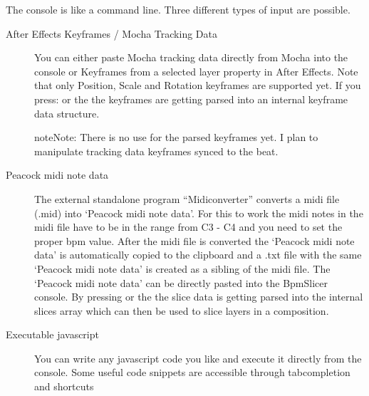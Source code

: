 \documentclass[a4paper,11pt,openany,oneside,english]{sphinxmanual}
\begin{document}
The console is like a command line. Three different types of input are
possible.
\begin{description}
\item[{After Effects Keyframes / Mocha Tracking Data}] \leavevmode
You can either paste Mocha tracking data directly from Mocha into the console or Keyframes from a selected layer property in After Effects. Note that only Position, Scale and Rotation keyframes are supported yet. If you press:  or the  the keyframes are getting parsed into an internal keyframe data structure.

\begin{sphinxadmonition}{note}{Note:}
There is no use for the parsed keyframes yet. I plan to manipulate tracking data keyframes synced to the beat.
\end{sphinxadmonition}

\item[{Peacock midi note data}] \leavevmode
The external standalone program “Midiconverter” converts a midi file (.mid) into ‘Peacock midi note data’. For this to work the midi notes in the midi file have to be in the range from C3 - C4 and you need to set the proper bpm value.
After the midi file is converted the ‘Peacock midi note data’ is automatically copied to the clipboard and a .txt file with the same ‘Peacock midi note data’ is created as a sibling of the midi file.
The ‘Peacock midi note data’ can be directly pasted into the BpmSlicer console. By pressing  or the  the slice data is getting parsed into the internal slices array which can then be used to slice layers in a composition.

\item[{Executable javascript}] \leavevmode
You can write any javascript code you like and execute it directly from the console. Some useful code snippets are accessible through tabcompletion and shortcuts

\end{description}
\end{document}
